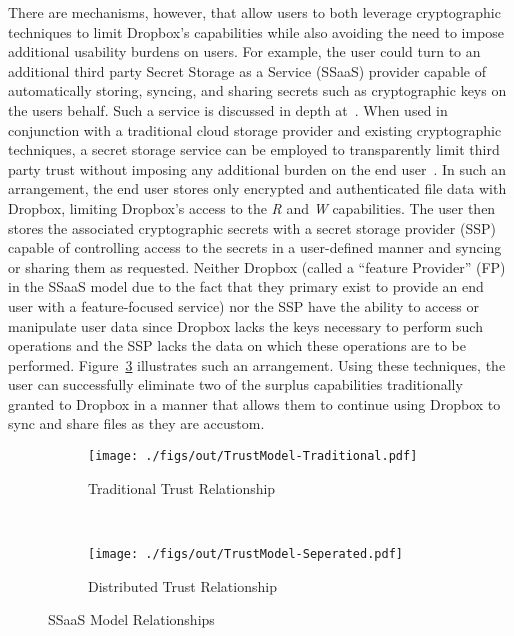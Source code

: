 There are mechanisms, however, that allow users to both leverage
cryptographic techniques to limit Dropbox's capabilities while also
avoiding the need to impose additional usability burdens on users. For
example, the user could turn to an additional third party Secret
Storage as a Service (SSaaS) provider capable of automatically
storing, syncing, and sharing secrets such as cryptographic keys on
the users behalf. Such a service is discussed in depth
at~\cite{custos-trios}. When used in conjunction with a traditional
cloud storage provider and existing cryptographic techniques, a secret
storage service can be employed to transparently limit third party
trust without imposing any additional burden on the end
user~\cite{sayler-phd}. In such an arrangement, the end user stores
only encrypted and authenticated file data with Dropbox, limiting
Dropbox's access to the \emph{R} and \emph{W} capabilities. The user
then stores the associated cryptographic secrets with a secret storage
provider (SSP) capable of controlling access to the secrets in a
user-defined manner and syncing or sharing them as requested. Neither
Dropbox (called a ``feature Provider'' (FP) in the SSaaS model due to
the fact that they primary exist to provide an end user with a
feature-focused service) nor the SSP have the ability to access or
manipulate user data since Dropbox lacks the keys necessary to perform
such operations and the SSP lacks the data on which these operations
are to be performed. Figure~\ref{fig:mitigation:trust} illustrates
such an arrangement. Using these techniques, the user can successfully
eliminate two of the surplus capabilities traditionally granted to
Dropbox in a manner that allows them to continue using Dropbox to sync
and share files as they are accustom.

\begin{figure}[t]
  \centering
  \begin{subfigure}[t]{0.48\textwidth}
    \centering
    \texttt{[image: ./figs/out/TrustModel-Traditional.pdf]}
    \caption{Traditional Trust Relationship}
    \label{fig:mitigation:trust:traditional}
  \end{subfigure}
  ~
  \begin{subfigure}[t]{0.48\textwidth}
    \centering
    \texttt{[image: ./figs/out/TrustModel-Seperated.pdf]}
    \caption{Distributed Trust Relationship}
    \label{fig:mitigation:trust:distributed}
  \end{subfigure}
  \caption{SSaaS Model Relationships}
  \label{fig:mitigation:trust}
\end{figure}

